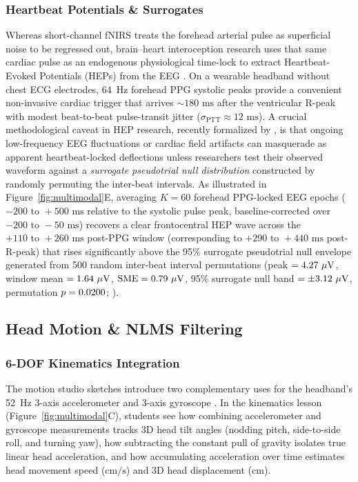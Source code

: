 \documentclass[11pt]{article}
\begin{document}
\subsubsection{Heartbeat Potentials \& Surrogates}
Whereas short-channel fNIRS treats the forehead arterial pulse as superficial noise to be regressed out, brain--heart interoception research uses that same cardiac pulse as an endogenous physiological time-lock to extract Heartbeat-Evoked Potentials (HEPs) from the EEG \citep{makowski2021neurokit2,cannard2024brainbeats,steinfath2025validating}. On a wearable headband without chest ECG electrodes, 64~Hz forehead PPG systolic peaks provide a convenient non-invasive cardiac trigger that arrives $\sim 180\text{ ms}$ after the ventricular R-peak with modest beat-to-beat pulse-transit jitter ($\sigma_{\text{PTT}} \approx 12\text{ ms}$). A crucial methodological caveat in HEP research, recently formalized by \citet{steinfath2025validating}, is that ongoing low-frequency EEG fluctuations or cardiac field artifacts can masquerade as apparent heartbeat-locked deflections unless researchers test their observed waveform against a \emph{surrogate pseudotrial null distribution} constructed by randomly permuting the inter-beat intervals. As illustrated in Figure~\ref{fig:multimodal}E, averaging $K = 60$ forehead PPG-locked EEG epochs ($-200\text{ to }+500\text{ ms}$ relative to the systolic pulse peak, baseline-corrected over $-200\text{ to }-50\text{ ms}$) recovers a clear frontocentral HEP wave across the $+110\text{ to }+260\text{ ms}$ post-PPG window (corresponding to $+290\text{ to }+440\text{ ms}$ post-R-peak) that rises significantly above the 95\% surrogate pseudotrial null envelope generated from 500 random inter-beat interval permutations (peak $= \HEPTruePeakUV\ \mu\text{V}$, window mean $= 1.64\ \mu\text{V}$, $\text{SME} = 0.79\ \mu\text{V}$, 95\% surrogate null band $= \pm \HEPSurrCIUV\ \mu\text{V}$, permutation $p = 0.0200$; \citealp{cannard2024brainbeats,steinfath2025validating}).

\subsection{Head Motion \& NLMS Filtering}

\subsubsection{6-DOF Kinematics Integration}
The motion studio sketches introduce two complementary uses for the headband's 52~Hz 3-axis accelerometer and 3-axis gyroscope \citep{rosanne2021adaptive,klug2022bemobil}. In the kinematics lesson (Figure~\ref{fig:multimodal}C), students see how combining accelerometer and gyroscope measurements tracks 3D head tilt angles (nodding pitch, side-to-side roll, and turning yaw), how subtracting the constant pull of gravity isolates true linear head acceleration, and how accumulating acceleration over time estimates head movement speed ($\text{cm/s}$) and 3D head displacement ($\text{cm}$).
\end{document}
